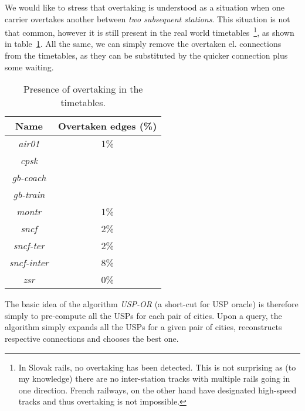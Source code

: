     \noindent We would like to stress that overtaking is understood as a situation when one carrier overtakes another between \textit{two subsequent stations}. This situation is not that common, however it is still present in the real world timetables~\footnote{In Slovak rails, no overtaking has been detected. This is not surprising as (to my knowledge) there are no inter-station tracks with multiple rails going in one direction. French railways, on the other hand have designated high-speed tracks and thus overtaking is not impossible.}, as shown in table~\ref{tab:overtake}. All the same, we can simply remove the overtaken el. connections from the timetables, as they can be substituted by the quicker connection plus some waiting. \\
    
    \begin{table}[h!]
    	\centering
		\begin{tabular}{c|c}
            \rowcolor{tablehead}
        	\textbf{Name} & \textbf{Overtaken edges (\%)} \\
			\hline
			\textit{air01} & 1\% \\
			\textit{cpsk} &  \\
			\textit{gb-coach} &  \\
			\textit{gb-train} &  \\
			\textit{montr} & 1\% \\
			\textit{sncf} & 2\% \\
			\textit{sncf-ter} & 2\% \\
			\textit{sncf-inter} & 8\% \\
			\textit{zsr} & 0\% \\
		\end{tabular}
		\caption{\label{tab:overtake} Presence of overtaking in the timetables.}
	\end{table}
	
	\noindent The basic idea of the algorithm \textit{USP-OR} (a short-cut for USP oracle) is therefore simply to pre-compute all the USPs for each pair of cities. Upon a query, the algorithm simply expands all the USPs for a given pair of cities, reconstructs respective connections and chooses the best one. \\
	
